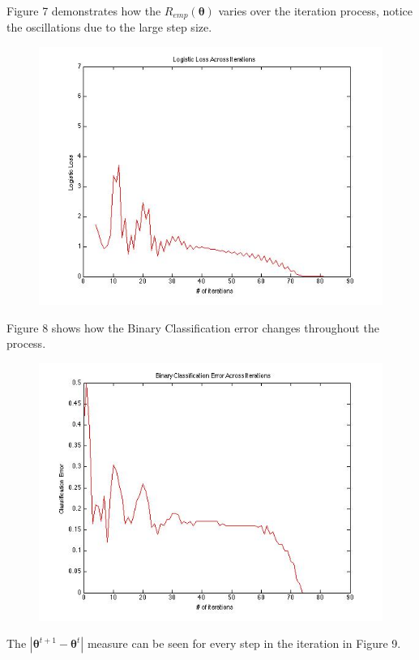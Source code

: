 \documentclass[paper=a4, fontsize=11pt]{scrartcl} %
\numberwithin{equation}{section} %
\numberwithin{figure}{section} %
\numberwithin{table}{section} %
\begin{document}
Figure 7 demonstrates how the $R_{emp}(\bm{\theta})$ varies over the iteration process, notice the oscillations due to the large step size.

\begin{figure}
\centering
\includegraphics[scale=0.4]{logisticloss.jpg}
\end{figure}

Figure 8 shows how the Binary Classification error changes throughout the process.

\begin{figure}
\centering
\includegraphics[scale=0.4]{BinClassErr.jpg}
\end{figure}

The $| \bm{\theta} ^{t+1} -  \bm{\theta} ^t|$ measure can be seen for every step in the iteration in Figure 9.
\end{document}
